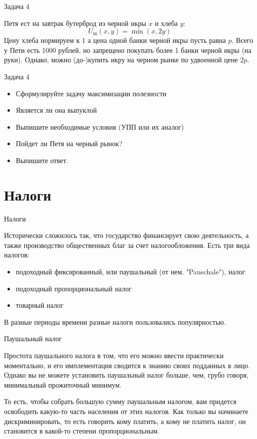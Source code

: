 \documentclass{beamer}
\begin{document}
\begin{frame}{Задача 4}

Петя ест на завтрак бутерброд из черной икры $x$ и хлеба $y$:
$$ U_{bb}(x,y) = \min(x, 2y)$$
Цену хлеба нормируем к 1 а цена одной банки черной икры пусть равна $p$. Всего у Пети есть 1000 рублей, но запрещено покупать более 1 банки черной икры (на руки). Однако, можно (до-)купить икру на черном рынке по удвоенной цене $2p$.
\end{frame}

\begin{frame}{Задача 4}

\begin{itemize}
  \item Сформулируйте задачу максимизации полезности
  \item Является ли она выпуклой
  \item Выпишите необходимые условия (УПП или их аналог)
  \item Пойдет ли Петя на черный рынок?
  \item Выпишите ответ.
\end{itemize}

\end{frame}

\section{Налоги}

\begin{frame}{Налоги}

Исторически сложилось так, что государство финансирует свою деятельность, а также производство общественных благ за счет налогообложения. Есть три вида налогов:

\begin{itemize}
\item \alert{подоходный фиксированный}, или паушальный (от нем. "Pauschale"), налог
\item \alert{подоходный пропорциональный} налог
\item \alert{товарный} налог

\end{itemize}

В разные периоды времени разные налоги пользовались популярностью. 

\end{frame}

\begin{frame}{Паушальный налог}

Простота паушального налога в том, что его можно ввести практически моментально, и его имплементация сводится к знанию своих подданных в лицо. Однако вы не можете установить паушальный налог больше, чем, грубо говоря, минимальный прожиточный минимум. 

То есть, чтобы собрать большую сумму паушальным налогом, вам придется освободить какую-то часть населения от этих налогов. Как только вы начинаете дискриминировать, то есть говорить кому платить, а кому не платить налог, он становится в какой-то степени пропорциональным.

\end{frame}
\end{document}
